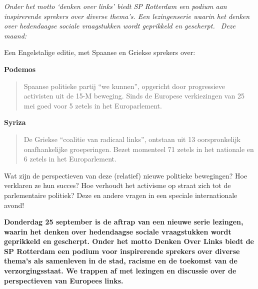 \documentclass[12pt]{article}
\begin{document}

\emph{Onder het motto `denken over links' biedt SP Rotterdam een podium aan
inspirerende sprekers over diverse thema's. Een lezingenserie waarin het denken
over hedendaagse sociale vraagstukken wordt geprikkeld en gescherpt. \ Deze
maand:}

\vfill
\vfill


\vfill

Een Engelstalige editie, met Spaanse en Griekse sprekers over:

\textbf{\large Podemos}
\begin{quote}
  Spaanse politieke partij ``we kunnen'', opgericht door progressieve
  activisten uit de 15-M beweging. Sinds de Europese verkiezingen van 25 mei
  goed voor 5 zetels in het Europarlement.
\end{quote}

\textbf{\large Syriza}
\begin{quote}
  De Griekse ``coalitie van radicaal links'', ontstaan uit 13 oorspronkelijk
  onafhankelijke groeperingen. Bezet momenteel 71 zetels in het nationale en 6
  zetels in het Europarlement.
\end{quote}

\vfill

Wat zijn de perspectieven van deze (relatief) nieuwe politieke bewegingen? Hoe verklaren 
ze hun succes? Hoe verhoudt het activisme op straat zich tot de
parlementaire politiek? Deze en andere vragen in een speciale internationale avond!

\DolHline

\newpage

\DolMega{\textcolor{DolRed}{Nieuw Links in Europa}}

\vfill

\textbf{Donderdag 25 september is de aftrap van een nieuwe serie lezingen, waarin het 
denken over hedendaagse sociale vraagstukken wordt geprikkeld en gescherpt. Onder 
het motto Denken Over Links biedt de SP Rotterdam een podium voor inspirerende 
sprekers over diverse thema's als samenleven in de stad, racisme en de toekomst van 
de verzorgingsstaat. We trappen af met lezingen en discussie over de perspectieven van 
Europees links.}

\vfill
\end{document}

